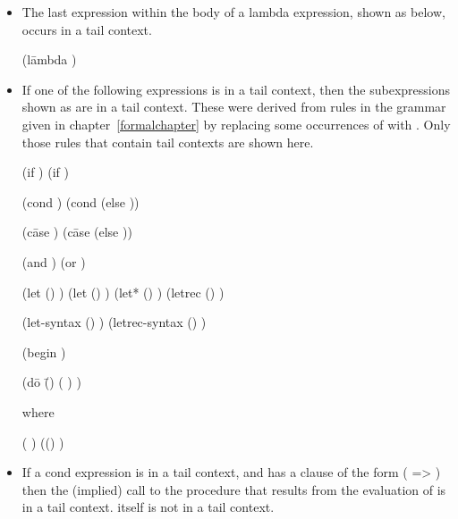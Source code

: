 \begin{itemize}
\item The last expression within the body of a lambda expression,
  shown as  below, occurs in a tail context.
\begin{grammar}%
(l\=ambda 
  \>  )
\end{grammar}%

\item If one of the following expressions is in a tail context,
then the subexpressions shown as  are in a tail context.
These were derived from rules in the grammar given in
chapter~\ref{formalchapter} by replacing some occurrences of 
with .  Only those rules that contain tail contexts
are shown here.

\begin{grammar}%
(if   )
(if  )

(cond )
(cond  (else ))

(c\=ase 
  \>)
(c\=ase 
  \>
  \>(else ))

(and  )
(or  )

(let () )
(let  () )
(let* () )
(letrec () )

(let-syntax () )
(letrec-syntax () )

(begin )

(d\=o \=()
  \>  \>( )
  \>)

{\rm where}

 \: ( )
 \: (() )

 \:  
 \:  
\end{grammar}%

\item
If a {\cf cond} expression is in a tail context, and has a clause of
the form {\cf ( => )}
then the (implied) call to
the procedure that results from the evaluation of  is in a
tail context.   itself is not in a tail context.

\end{itemize}

